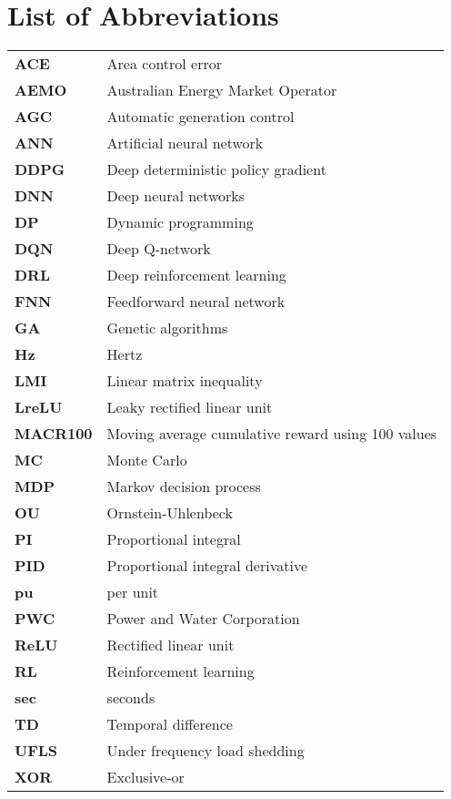 \chapter*{List of Abbreviations} %
\begin{tabular}{p{3cm}l}
\textbf{ACE}		&	Area control error \\
\textbf{AEMO}		&	Australian Energy Market Operator \\
\textbf{AGC}		&	Automatic generation control \\
\textbf{ANN}		&	Artificial neural network \\
\textbf{DDPG}		&	Deep deterministic policy gradient\\
\textbf{DNN}		&	Deep neural networks \\
\textbf{DP}			&	Dynamic programming \\
\textbf{DQN}		&	Deep Q-network \\
\textbf{DRL}		& 	Deep reinforcement learning \\
\textbf{FNN}		&	Feedforward neural network \\
\textbf{GA}			&	Genetic algorithms \\
\textbf{Hz}			&	Hertz \\
\textbf{LMI}		&	Linear matrix inequality \\
\textbf{LreLU}		&	Leaky rectified linear unit \\
\textbf{MACR100}	&	Moving average cumulative reward using 100 values \\
\textbf{MC}			&	Monte Carlo \\
\textbf{MDP}		&	Markov decision process \\
\textbf{OU}			&	Ornstein-Uhlenbeck \\
\textbf{PI}			&	Proportional integral \\
\textbf{PID}		&	Proportional integral derivative \\
\textbf{pu}			&	per unit \\
\textbf{PWC}		&	Power and Water Corporation \\
\textbf{ReLU}		&	Rectified linear unit \\
\textbf{RL}			&	Reinforcement learning \\
\textbf{sec}		&	seconds \\
\textbf{TD}			&	Temporal difference \\
\textbf{UFLS}		&	Under frequency load shedding \\
\textbf{XOR}		&	Exclusive-or \\
\end{tabular}